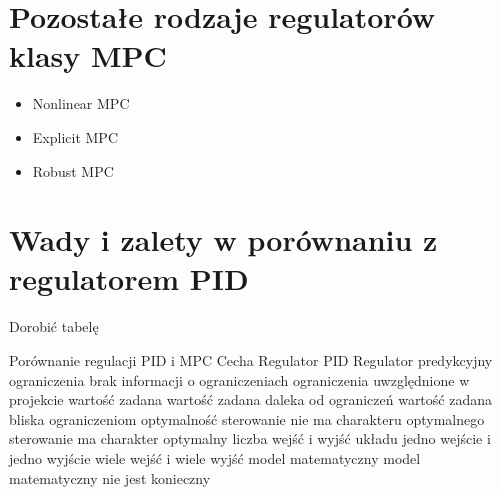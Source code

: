 \section{Pozostałe rodzaje regulatorów klasy MPC} \label{sec:other}

\begin{itemize}
	\item Nonlinear MPC
	\item Explicit MPC
    \item Robust MPC
\end{itemize}

\section{Wady i zalety w porównaniu z regulatorem PID} \label{sec:comparison}
Dorobić tabelę

Porównanie regulacji PID i MPC
Cecha	Regulator PID	Regulator predykcyjny
ograniczenia	brak informacji o ograniczeniach	ograniczenia uwzględnione w projekcie
wartość zadana	wartość zadana daleka od ograniczeń	wartość zadana bliska ograniczeniom
optymalność	sterowanie nie ma charakteru optymalnego	sterowanie ma charakter optymalny
liczba wejść i wyjść układu	jedno wejście i jedno wyjście	wiele wejść i wiele wyjść
model matematyczny	model matematyczny nie jest konieczny